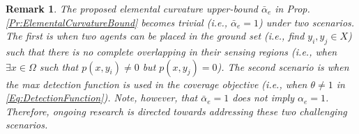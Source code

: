 \documentclass[letterpaper, 10 pt, conference]{ieeeconf}
\newtheorem{remark}{Remark}
\begin{document}








\begin{remark}\label{Rm:ElementalCurvatureBoundTriviality}
The proposed elemental curvature upper-bound $\bar{\alpha}_e$ in Prop. \ref{Pr:ElementalCurvatureBound} becomes trivial (i.e., $\bar{\alpha}_e=1$) under two scenarios. The first is when two agents can be placed in the ground set (i.e., find $y_i,y_j\in X$) such that there is no complete overlapping in their sensing regions (i.e., when $\exists x\in \Omega$ such that $p(x,y_i) \neq 0$ but $p(x,y_j)=0$). The second scenario is when the max detection function is used in the coverage objective (i.e., when $\theta \neq 1$ in \eqref{Eq:DetectionFunction}). Note, however, that $\bar{\alpha}_e = 1$ does not imply $\alpha_e = 1$. Therefore, ongoing research is directed towards addressing these two challenging scenarios.
\end{remark}
\end{document}
